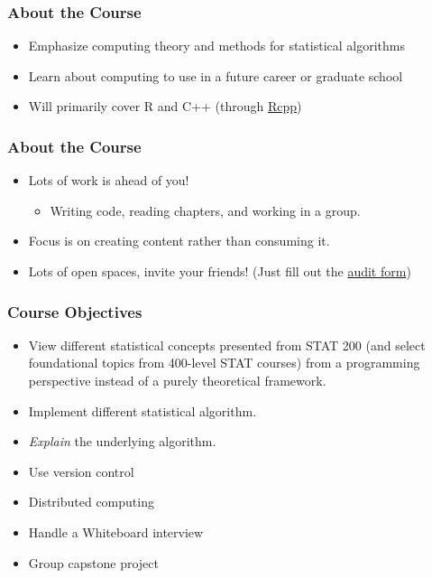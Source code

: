 \documentclass{beamer}\usepackage[]{graphicx}\usepackage[]{color}
\begin{document}
\begin{frame}
\frametitle{About the Course}

\begin{itemize}
\item Emphasize computing theory and methods for statistical algorithms
\item Learn about computing to use in a future career or graduate school
\item Will primarily cover R and C++ (through \href{http://gallery.rcpp.com}{Rcpp})
\end{itemize}

\end{frame}

\begin{frame}
\frametitle{About the Course}

\begin{itemize}
\item Lots of work is ahead of you!
\begin{itemize}
\item Writing code, reading chapters, and working in a group.
\end{itemize}
\item Focus is on creating content rather than consuming it.
\item Lots of open spaces, invite your friends! (Just fill out the \href{https://registrar.illinois.edu/Media/Default/RGSTRNS/Auditors_Permit.pdf}{audit form})
\end{itemize}

\end{frame}


\begin{frame}
\frametitle{Course Objectives}

\begin{itemize}
  \item View different statistical concepts presented from STAT 200 (and select foundational topics from 400-level STAT courses) from a programming perspective instead of a purely theoretical framework.
  \item Implement different statistical algorithm.
  \item \emph{Explain} the underlying algorithm.
  \item Use version control
  \item Distributed computing
  \item Handle a Whiteboard interview
  \item Group capstone project
\end{itemize}

\end{frame}
\end{document}

